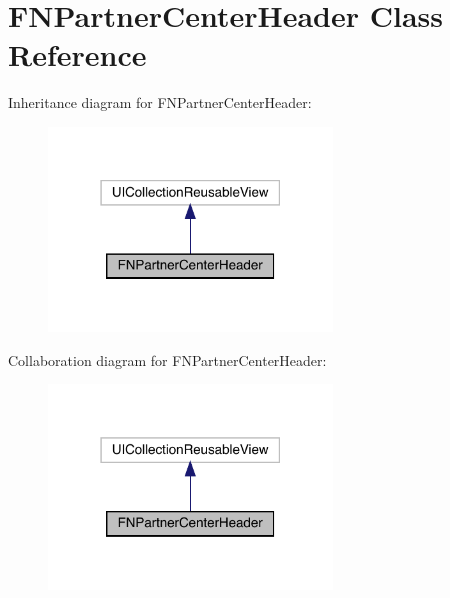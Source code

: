 \hypertarget{interface_f_n_partner_center_header}{}\section{F\+N\+Partner\+Center\+Header Class Reference}
\label{interface_f_n_partner_center_header}


Inheritance diagram for F\+N\+Partner\+Center\+Header\+:\nopagebreak
\begin{figure}[H]
\begin{center}
\leavevmode
\includegraphics[width=214pt]{interface_f_n_partner_center_header__inherit__graph}
\end{center}
\end{figure}


Collaboration diagram for F\+N\+Partner\+Center\+Header\+:\nopagebreak
\begin{figure}[H]
\begin{center}
\leavevmode
\includegraphics[width=214pt]{interface_f_n_partner_center_header__coll__graph}
\end{center}
\end{figure}

